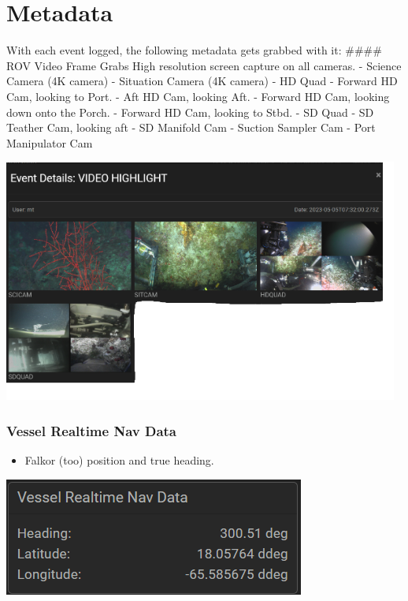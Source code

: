 \documentclass[
  letterpaper,
  DIV=11,
  numbers=noendperiod]{scrreprt}
\providecommand{\tightlist}{%
  \setlength{\itemsep}{0pt}\setlength{\parskip}{0pt}}\usepackage{longtable,booktabs,array}
\begin{document}
\hypertarget{metadata}{%
\section{Metadata}\label{metadata}}

With each event logged, the following metadata gets grabbed with it:
\#\#\#\# ROV Video Frame Grabs High resolution screen capture on all
cameras. - Science Camera (4K camera) - Situation Camera (4K camera) -
HD Quad - Forward HD Cam, looking to Port. - Aft HD Cam, looking Aft. -
Forward HD Cam, looking down onto the Porch. - Forward HD Cam, looking
to Stbd. - SD Quad - SD Teather Cam, looking aft - SD Manifold Cam -
Suction Sampler Cam - Port Manipulator Cam

\includegraphics{images/eventdetails.png}

\hypertarget{vessel-realtime-nav-data}{%
\subsubsection{Vessel Realtime Nav
Data}\label{vessel-realtime-nav-data}}

\begin{itemize}
\tightlist
\item
  Falkor (too) position and true heading.
\end{itemize}

\includegraphics{images/image2.png}
\end{document}
